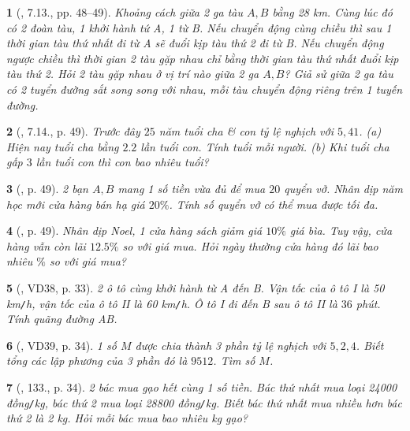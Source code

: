 \documentclass{article}
\newtheorem{baitoan}{}
\begin{document}
\begin{baitoan}[\cite{Binh_boi_duong_Toan_7_tap_1}, 7.13., pp. 48--49]
	Khoảng cách giữa 2 ga tàu $A,B$ bằng {\rm28 km}. Cùng lúc đó có 2 đoàn tàu, 1 khởi hành tứ A, 1 từ B. Nếu chuyển động cùng chiều thì sau 1 thời gian tàu thứ nhất đi từ A sẽ đuổi kịp tàu thứ 2 đi từ B. Nếu chuyển động ngược chiều thì thời gian 2 tàu gặp nhau chỉ bằng thời gian tàu thứ nhất đuổi kịp tàu thứ 2. Hỏi 2 tàu gặp nhau ở vị trí nào giữa 2 ga $A,B$? Giả sử giữa 2 ga tàu có 2 tuyển đường sắt song song với nhau, mỗi tàu chuyển động riêng trên 1 tuyến đường.
\end{baitoan}

\begin{baitoan}[\cite{Binh_boi_duong_Toan_7_tap_1}, 7.14., p. 49]
	Trước đây $25$ năm tuổi cha \& con tỷ lệ nghịch với $5,41$. (a) Hiện nay tuổi cha bằng $2.2$ lần tuổi con. Tính tuổi mỗi người. (b) Khi tuổi cha gấp $3$ lần tuổi con thì con bao nhiêu tuổi?
\end{baitoan}

\begin{baitoan}[\cite{Binh_boi_duong_Toan_7_tap_1}, p. 49]
	2 bạn $A,B$ mang 1 số tiền vừa đủ để mua $20$ quyển vở. Nhân dịp năm học mới cửa hàng bán hạ giá $20\%$. Tính số quyển vở có thể mua được tối đa.
\end{baitoan}

\begin{baitoan}[\cite{Binh_boi_duong_Toan_7_tap_1}, p. 49]
	Nhân dịp Noel, 1 cửa hàng sách giảm giá $10\%$ giá bìa. Tuy vậy, cửa hàng vẫn còn lãi $12.5\%$ so với giá mua. Hỏi ngày thường cửa hàng đó lãi bao nhiêu $\%$ so với giá mua?
\end{baitoan}

\begin{baitoan}[\cite{Tuyen_Toan_7}, VD38, p. 33]
	2 ô tô cùng khởi hành từ A đến B. Vận tốc của ô tô I là {\rm50 km{\tt/}h}, vận tốc của ô tô II là {\rm60 km{\tt/}h}. Ô tô I đi đến B sau ô tô II là $36$ phút. Tính quãng đường AB.
\end{baitoan}

\begin{baitoan}[\cite{Tuyen_Toan_7}, VD39, p. 34]
	1 số $M$ được chia thành 3 phần tỷ lệ nghịch với $5,2,4$. Biết tổng các lập phương của 3 phần đó là $9512$. Tìm số $M$.
\end{baitoan}

\begin{baitoan}[\cite{Tuyen_Toan_7}, 133., p. 34]
	2 bác mua gạo hết cùng 1 số tiền. Bác thứ nhất mua loại {\rm24000 đồng{\tt/}kg}, bác thứ 2 mua loại {\rm28800 đồng{\tt/}kg}. Biết bác thứ nhất mua nhiều hơn bác thứ 2 là {\rm2 kg}. Hỏi mỗi bác mua bao nhiêu {\rm kg} gạo?
\end{baitoan}
\end{document}
